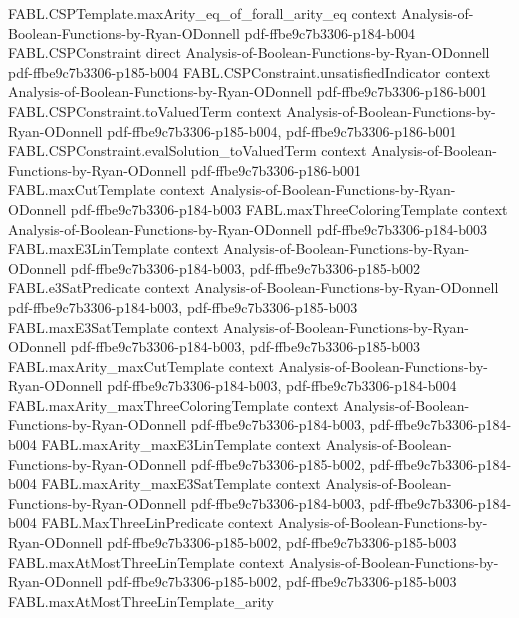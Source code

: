 \begin{theorem}
\proofstep
  {FABL.CSPTemplate.maxArity_eq_of_forall_arity_eq}
  {context}
  {Analysis-of-Boolean-Functions-by-Ryan-ODonnell}
  {pdf-ffbe9c7b3306-p184-b004}
\proofstep
  {FABL.CSPConstraint}
  {direct}
  {Analysis-of-Boolean-Functions-by-Ryan-ODonnell}
  {pdf-ffbe9c7b3306-p185-b004}
\proofstep
  {FABL.CSPConstraint.unsatisfiedIndicator}
  {context}
  {Analysis-of-Boolean-Functions-by-Ryan-ODonnell}
  {pdf-ffbe9c7b3306-p186-b001}
\proofstep
  {FABL.CSPConstraint.toValuedTerm}
  {context}
  {Analysis-of-Boolean-Functions-by-Ryan-ODonnell}
  {pdf-ffbe9c7b3306-p185-b004,
    pdf-ffbe9c7b3306-p186-b001}
\proofstep
  {FABL.CSPConstraint.evalSolution_toValuedTerm}
  {context}
  {Analysis-of-Boolean-Functions-by-Ryan-ODonnell}
  {pdf-ffbe9c7b3306-p186-b001}
\proofstep
  {FABL.maxCutTemplate}
  {context}
  {Analysis-of-Boolean-Functions-by-Ryan-ODonnell}
  {pdf-ffbe9c7b3306-p184-b003}
\proofstep
  {FABL.maxThreeColoringTemplate}
  {context}
  {Analysis-of-Boolean-Functions-by-Ryan-ODonnell}
  {pdf-ffbe9c7b3306-p184-b003}
\proofstep
  {FABL.maxE3LinTemplate}
  {context}
  {Analysis-of-Boolean-Functions-by-Ryan-ODonnell}
  {pdf-ffbe9c7b3306-p184-b003,
    pdf-ffbe9c7b3306-p185-b002}
\proofstep
  {FABL.e3SatPredicate}
  {context}
  {Analysis-of-Boolean-Functions-by-Ryan-ODonnell}
  {pdf-ffbe9c7b3306-p184-b003,
    pdf-ffbe9c7b3306-p185-b003}
\proofstep
  {FABL.maxE3SatTemplate}
  {context}
  {Analysis-of-Boolean-Functions-by-Ryan-ODonnell}
  {pdf-ffbe9c7b3306-p184-b003,
    pdf-ffbe9c7b3306-p185-b003}
\proofstep
  {FABL.maxArity_maxCutTemplate}
  {context}
  {Analysis-of-Boolean-Functions-by-Ryan-ODonnell}
  {pdf-ffbe9c7b3306-p184-b003,
    pdf-ffbe9c7b3306-p184-b004}
\proofstep
  {FABL.maxArity_maxThreeColoringTemplate}
  {context}
  {Analysis-of-Boolean-Functions-by-Ryan-ODonnell}
  {pdf-ffbe9c7b3306-p184-b003,
    pdf-ffbe9c7b3306-p184-b004}
\proofstep
  {FABL.maxArity_maxE3LinTemplate}
  {context}
  {Analysis-of-Boolean-Functions-by-Ryan-ODonnell}
  {pdf-ffbe9c7b3306-p185-b002,
    pdf-ffbe9c7b3306-p184-b004}
\proofstep
  {FABL.maxArity_maxE3SatTemplate}
  {context}
  {Analysis-of-Boolean-Functions-by-Ryan-ODonnell}
  {pdf-ffbe9c7b3306-p184-b003,
    pdf-ffbe9c7b3306-p184-b004}
\proofstep
  {FABL.MaxThreeLinPredicate}
  {context}
  {Analysis-of-Boolean-Functions-by-Ryan-ODonnell}
  {pdf-ffbe9c7b3306-p185-b002,
    pdf-ffbe9c7b3306-p185-b003}
\proofstep
  {FABL.maxAtMostThreeLinTemplate}
  {context}
  {Analysis-of-Boolean-Functions-by-Ryan-ODonnell}
  {pdf-ffbe9c7b3306-p185-b002,
    pdf-ffbe9c7b3306-p185-b003}
\proofstep
  {FABL.maxAtMostThreeLinTemplate_arity}

\end{theorem}
